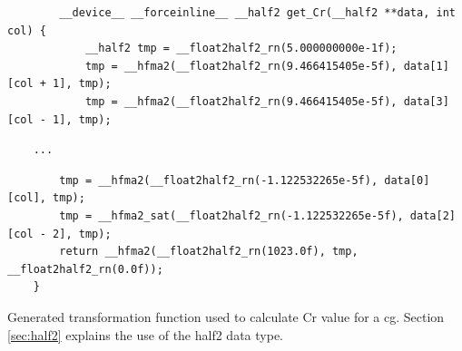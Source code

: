 \begin{listing}[H]
    \begin{verbatim}
        __device__ __forceinline__ __half2 get_Cr(__half2 **data, int col) {
            __half2 tmp = __float2half2_rn(5.000000000e-1f);
            tmp = __hfma2(__float2half2_rn(9.466415405e-5f), data[1][col + 1], tmp);
            tmp = __hfma2(__float2half2_rn(9.466415405e-5f), data[3][col - 1], tmp);
        \end{verbatim}
    \vspace{-28pt}
    \begin{verbatim}
    ...
    \end{verbatim}
    \vspace{-28pt}
    \begin{verbatim}
        tmp = __hfma2(__float2half2_rn(-1.122532265e-5f), data[0][col], tmp);
        tmp = __hfma2_sat(__float2half2_rn(-1.122532265e-5f), data[2][col - 2], tmp);
        return __hfma2(__float2half2_rn(1023.0f), tmp, __float2half2_rn(0.0f));
    }
    \end{verbatim}
    \caption{Generated transformation function used to calculate Cr value for a \gls{cg}.
        Section \ref{sec:half2} explains the use of the \gls{half2} data type.}
    \label{listing:generated_function}
\end{listing}